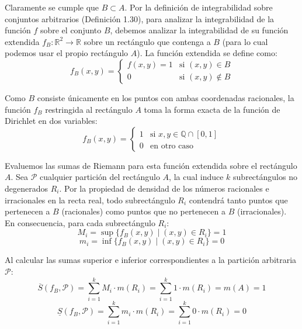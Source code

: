\documentclass[11pt,letterpaper]{article}
\begin{document}
Claramente se cumple que $B \subset A$. Por la definición de integrabilidad sobre conjuntos arbitrarios (Definición 1.30), para analizar la integrabilidad de la función $f$ sobre el conjunto $B$, debemos analizar la integrabilidad de su función extendida $f_B: \mathbb{R}^2 \rightarrow \mathbb{R}$ sobre un rectángulo que contenga a $B$ (para lo cual podemos usar el propio rectángulo $A$). La función extendida se define como:
\begin{equation*}
f_B(x,y) = 
\begin{cases} 
f(x,y) = 1 & \text{si } (x,y) \in B \\ 
0 & \text{si } (x,y) \notin B 
\end{cases}
\end{equation*}

Como $B$ consiste únicamente en los puntos con ambas coordenadas racionales, la función $f_B$ restringida al rectángulo $A$ toma la forma exacta de la función de Dirichlet en dos variables:
\begin{equation*}
f_B(x,y) = 
\begin{cases} 
1 & \text{si } x, y \in \mathbb{Q} \cap [0,1] \\ 
0 & \text{en otro caso}
\end{cases}
\end{equation*}

Evaluemos las sumas de Riemann para esta función extendida sobre el rectángulo $A$. Sea $\mathcal{P}$ cualquier partición del rectángulo $A$, la cual induce $k$ subrectángulos no degenerados $R_i$. Por la propiedad de densidad de los números racionales e irracionales en la recta real, todo subrectángulo $R_i$ contendrá tanto puntos que pertenecen a $B$ (racionales) como puntos que no pertenecen a $B$ (irracionales). En consecuencia, para cada subrectángulo $R_i$:
\begin{equation*}
M_i = \sup \{ f_B(x,y) \mid (x,y) \in R_i \} = 1
\end{equation*}
\begin{equation*}
m_i = \inf \{ f_B(x,y) \mid (x,y) \in R_i \} = 0
\end{equation*}

Al calcular las sumas superior e inferior correspondientes a la partición arbitraria $\mathcal{P}$:
\begin{equation*}
\overline{S}(f_B, \mathcal{P}) = \sum_{i=1}^{k} M_i \cdot m(R_i) = \sum_{i=1}^{k} 1 \cdot m(R_i) = m(A) = 1
\end{equation*}
\begin{equation*}
\underline{S}(f_B, \mathcal{P}) = \sum_{i=1}^{k} m_i \cdot m(R_i) = \sum_{i=1}^{k} 0 \cdot m(R_i) = 0
\end{equation*}
\end{document}

